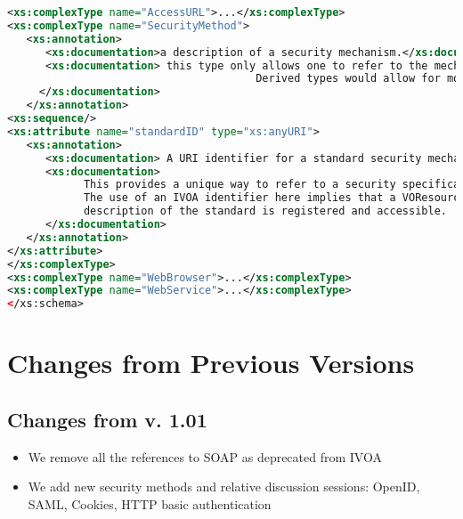 \documentclass[11pt,a4paper]{ivoa}
\begin{document}
\begin{lstlisting}[language=xml,basicstyle=\footnotesize]
<xs:complexType name="AccessURL">...</xs:complexType>
<xs:complexType name="SecurityMethod">
   <xs:annotation>
      <xs:documentation>a description of a security mechanism.</xs:documentation>
      <xs:documentation> this type only allows one to refer to the mechanism via a URI.  
                                       Derived types would allow for more metadata.
     </xs:documentation>
   </xs:annotation>
<xs:sequence/>
<xs:attribute name="standardID" type="xs:anyURI">
   <xs:annotation>
      <xs:documentation> A URI identifier for a standard security mechanism. </xs:documentation>
      <xs:documentation>
            This provides a unique way to refer to a security specification standard. 
            The use of an IVOA identifier here implies that a VOResource 
            description of the standard is registered and accessible.
      </xs:documentation>
   </xs:annotation>
</xs:attribute>
</xs:complexType>
<xs:complexType name="WebBrowser">...</xs:complexType>
<xs:complexType name="WebService">...</xs:complexType>
</xs:schema>
\end{lstlisting}


\section{Changes from Previous Versions}

 
\subsection {Changes from v. 1.01}
\begin{itemize}
\item We remove all the references to SOAP as deprecated from IVOA
\item We add new security methods and relative discussion sessions: OpenID, SAML, Cookies, HTTP basic authentication
\end{itemize}



\end{document}
